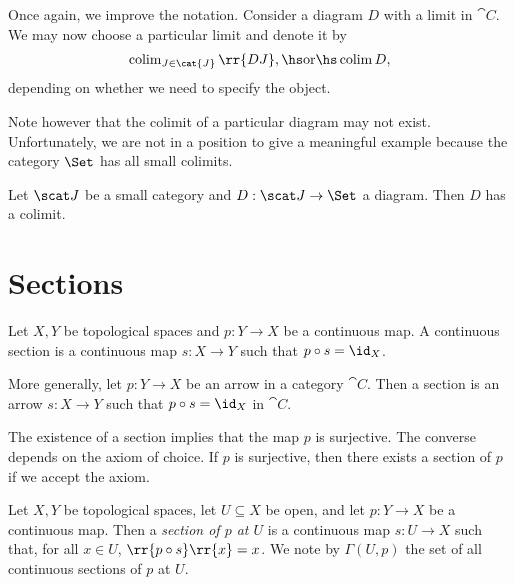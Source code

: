 \documentclass{article}
\begin{document}
\begin{notation}
  Once again, we improve the notation. Consider a diagram
  $D$ with a limit in $\cat{C}$. We may now choose a particular limit and denote
  it by
  \begin{align*}
    \colim_{J\in\cat{J}}\rr{DJ},\hs\text{or}\hs\colim D,
  \end{align*}
  depending on whether we need to specify the object.
\end{notation}

Note however that the colimit of a particular diagram may not exist. Unfortunately, we
are not in a position to give a meaningful example because the category $\Set$ has
all small colimits.

\begin{theorem}
  Let $\scat J$ be a small category and $D:\scat J\to\Set$ a diagram. Then $D$ has a colimit.
\end{theorem}

\section{Sections}\label{sec:sections}

\begin{definition}
  Let $X,Y$ be topological spaces and $p:Y\to X$ be a continuous map. A continuous section
  is a continuous map $s:X\to Y$ such that $p \circ s = \id_X$.

  More generally, let $p:Y\to X$ be an arrow in a category $\cat{C}$. Then a section
  is an arrow $s:X\to Y$ such that $p\circ s=\id_X$ in $\cat{C}$.
\end{definition}

\begin{remark}\label{remark:continuity_and_sections}
  The existence of a section implies that the map $p$ is surjective. The converse
  depends on the axiom of choice. If $p$ is surjective, then there exists a section
  of $p$ if we accept the axiom.
\end{remark}

\begin{definition}
  Let $X,Y$ be topological spaces, let $U\subseteq X$ be open, and let $p:Y\to X$ be
  a continuous map. Then a \emph{section of $p$ at $U$} is a continuous map
  $s:U\to X$ such that, for all $x\in U$, $\rr{p\circ s}\rr{x}=x$.
  We note by $\Gamma(U,p)$ the set of all continuous sections of $p$ at $U$.
\end{definition}
\end{document}
